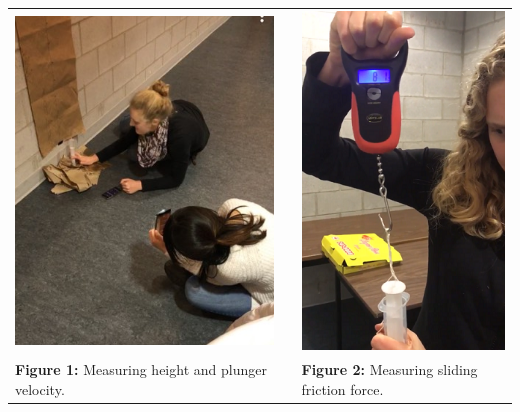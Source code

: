 \documentclass{article}
\newenvironment{nscenter}
 {\parskip=0pt\par\nopagebreak\centering}
 {\par\noindent\ignorespacesafterend}
\begin{document}
\begin{nscenter}
\begin{tabular}{ p{5cm} p{1cm} p{5cm} }
\begin{nscenter}\includegraphics{MeasuringHeight.png}\end{nscenter} & & \begin{nscenter}\includegraphics{MeasuringSlidingFriction.png}\end{nscenter} \\
\begin{nscenter}\textbf{Figure 1:} Measuring height and plunger velocity. \end{nscenter} & & \begin{nscenter}\textbf{Figure 2:} Measuring sliding friction force. \end{nscenter}
\end{tabular}
\end{nscenter}
\end{document}
